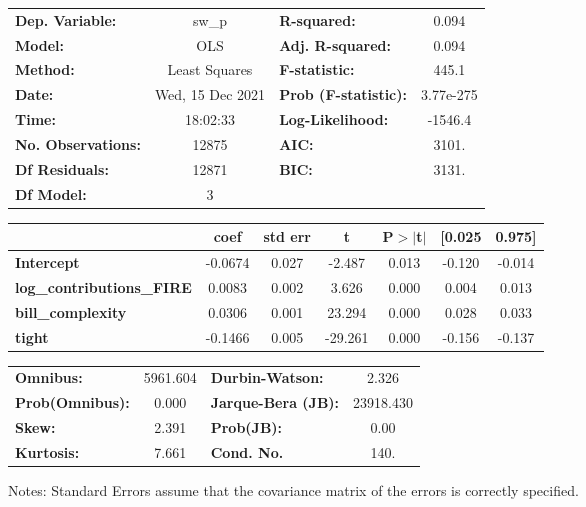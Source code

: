 \begin{center}
\begin{tabular}{lclc}
\toprule
\textbf{Dep. Variable:}           &      sw\_p       & \textbf{  R-squared:         } &     0.094   \\
\textbf{Model:}                   &       OLS        & \textbf{  Adj. R-squared:    } &     0.094   \\
\textbf{Method:}                  &  Least Squares   & \textbf{  F-statistic:       } &     445.1   \\
\textbf{Date:}                    & Wed, 15 Dec 2021 & \textbf{  Prob (F-statistic):} & 3.77e-275   \\
\textbf{Time:}                    &     18:02:33     & \textbf{  Log-Likelihood:    } &   -1546.4   \\
\textbf{No. Observations:}        &       12875      & \textbf{  AIC:               } &     3101.   \\
\textbf{Df Residuals:}            &       12871      & \textbf{  BIC:               } &     3131.   \\
\textbf{Df Model:}                &           3      & \textbf{                     } &             \\
\bottomrule
\end{tabular}
\begin{tabular}{lcccccc}
                                  & \textbf{coef} & \textbf{std err} & \textbf{t} & \textbf{P$> |$t$|$} & \textbf{[0.025} & \textbf{0.975]}  \\
\midrule
\textbf{Intercept}                &      -0.0674  &        0.027     &    -2.487  &         0.013        &       -0.120    &       -0.014     \\
\textbf{log\_contributions\_FIRE} &       0.0083  &        0.002     &     3.626  &         0.000        &        0.004    &        0.013     \\
\textbf{bill\_complexity}         &       0.0306  &        0.001     &    23.294  &         0.000        &        0.028    &        0.033     \\
\textbf{tight}                    &      -0.1466  &        0.005     &   -29.261  &         0.000        &       -0.156    &       -0.137     \\
\bottomrule
\end{tabular}
\begin{tabular}{lclc}
\textbf{Omnibus:}       & 5961.604 & \textbf{  Durbin-Watson:     } &     2.326  \\
\textbf{Prob(Omnibus):} &   0.000  & \textbf{  Jarque-Bera (JB):  } & 23918.430  \\
\textbf{Skew:}          &   2.391  & \textbf{  Prob(JB):          } &      0.00  \\
\textbf{Kurtosis:}      &   7.661  & \textbf{  Cond. No.          } &      140.  \\
\bottomrule
\end{tabular}
\end{center}

Notes: \newline
 [1] Standard Errors assume that the covariance matrix of the errors is correctly specified.